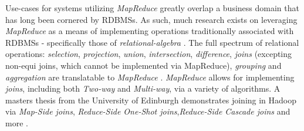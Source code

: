 Use-cases for systems utilizing \textit{MapReduce} greatly overlap a business domain that has long been cornered by RDBMSs. As such, much research exists on leveraging \textit{MapReduce} as a means of implementing operations traditionally associated with RDBMSs - specifically those of \textit{relational-algebra} \cite{mining2011,chandar2010}. The full spectrum of relational operations: \textit{selection}, \textit{projection}, \textit{union}, \textit{intersection}, \textit{difference}, \textit{joins} (excepting non-equi joins, which cannot be implemented via MapReduce), \textit{grouping} and \textit{aggregation} are translatable to \textit{MapReduce} \cite{mining2011}. \textit{MapReduce} allows for implementing \textit{joins}, including both \textit{Two-way} and \textit{Multi-way}, via a variety of algorithms. A masters thesis from the University of Edinburgh demonstrates joining in Hadoop via \textit{Map-Side joins}, \textit{Reduce-Side One-Shot joins},\textit{Reduce-Side Cascade joins} and more \cite{chandar2010}.